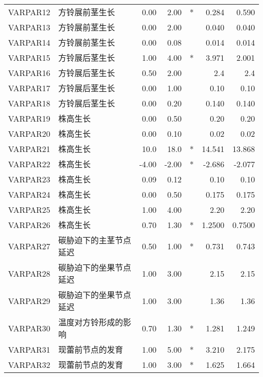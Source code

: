 \begin{longtable}{llrrcrr}
    VARPAR12 & 方铃展前茎生长             & 0.00   & 2.00   & *   & 0.284   & 0.590   \\
    VARPAR13 & 方铃展前茎生长             & 0.00   & 2.00   &     & 0.040   & 0.040   \\
    VARPAR14 & 方铃展前茎生长             & 0.00   & 0.08   &     & 0.014   & 0.014   \\
    VARPAR15 & 方铃展后茎生长             & 1.00   & 4.00   & *   & 3.971   & 2.001   \\
    VARPAR16 & 方铃展后茎生长             & 0.50   & 2.00   &     & 2.4     & 2.4     \\
    VARPAR17 & 方铃展后茎生长             & 0.00   & 1.00   &     & 0.10    & 0.10    \\
    VARPAR18 & 方铃展后茎生长             & 0.00   & 0.20   &     & 0.140   & 0.140   \\
    VARPAR19 & 株高生长                   & 0.00   & 0.50   &     & 0.20    & 0.20    \\
    VARPAR20 & 株高生长                   & 0.00   & 0.10   &     & 0.02    & 0.02    \\
    VARPAR21 & 株高生长                   & 10.0   & 18.0   & *   & 14.541  & 13.868  \\
    VARPAR22 & 株高生长                   & -4.00  & -2.00  & *   & -2.686  & -2.077  \\
    VARPAR23 & 株高生长                   & 0.09   & 0.12   &     & 0.10    & 0.10    \\
    VARPAR24 & 株高生长                   & 0.00   & 0.50   &     & 0.175   & 0.175   \\
    VARPAR25 & 株高生长                   & 1.00   & 4.00   &     & 2.20    & 2.20    \\
    VARPAR26 & 株高生长                   & 0.70   & 1.30   & *   & 1.2500  & 0.7500  \\
    VARPAR27 & 碳胁迫下的主茎节点延迟     & 0.50   & 1.00   & *   & 0.731   & 0.743   \\
    VARPAR28 & 碳胁迫下的坐果节点延迟     & 1.00   & 3.00   &     & 2.15    & 2.15    \\
    VARPAR29 & 碳胁迫下的坐果节点延迟     & 1.00   & 3.00   &     & 1.36    & 1.36    \\
    VARPAR30 & 温度对方铃形成的影响       & 0.70   & 1.30   & *   & 1.281   & 1.249   \\
    VARPAR31 & 现蕾前节点的发育           & 1.00   & 5.00   & *   & 3.210   & 2.175   \\
    VARPAR32 & 现蕾前节点的发育           & 1.00   & 3.00   & *   & 1.625   & 1.664   \\

\end{longtable}
